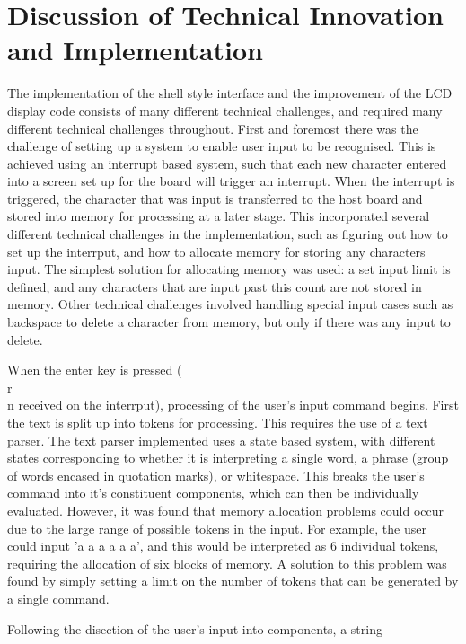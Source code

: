 \section{Discussion of Technical Innovation and Implementation}

The implementation of the shell style interface and the improvement of the LCD 
display code consists of many different technical challenges, and required many 
different technical challenges throughout. First and foremost there was the 
challenge of setting up a system to enable user input to be recognised. This is 
achieved using an interrupt based system, such that each new character entered 
into a screen set up for the board will trigger an interrupt. When the 
interrupt is triggered, the character that was input is transferred to the host 
board and stored into memory for processing at a later stage. This incorporated 
several different technical challenges in the implementation, such as figuring 
out how to set up the interrput, and how to allocate memory for storing any 
characters input. The simplest solution for allocating memory was used: a set 
input limit is defined, and any characters that are input past this count are 
not stored in memory. Other technical challenges involved handling special input 
cases such as backspace to delete a character from memory, but only if there 
was any input to delete. 
\par\bigskip\noindent
When the enter key is pressed (\\r\\n received on the interrput), processing of the user's 
input command begins. 
First the text is split up into tokens for processing. This 
requires the use of a text parser. The text parser implemented uses a state 
based system, with different states corresponding to whether it is interpreting 
a single word, a phrase (group of words encased in quotation marks), or 
whitespace. This breaks the user's command into it's constituent components, 
which can then be individually evaluated. However, it was found that memory 
allocation problems could occur due to the large range of possible tokens in 
the input. For example, the user could input 'a a a a a a', and this would be 
interpreted as 6 individual tokens, requiring the allocation of six blocks of 
memory. A solution to this problem was found by simply setting a limit on the 
number of tokens that can be generated by a single command. 
\par\bigskip\noindent
Following the disection of the user's input into components, a string 
